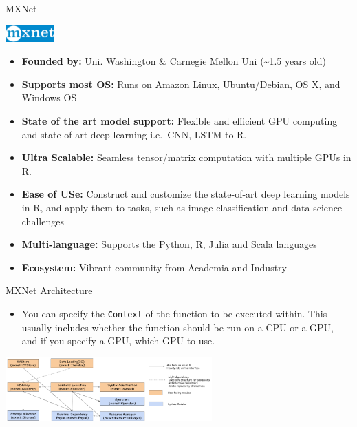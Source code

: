 \documentclass[ignorenonframetext,]{beamer}
\providecommand{\tightlist}{%
\setlength{\itemsep}{0pt}\setlength{\parskip}{0pt}}
\begin{document}
\begin{frame}{MXNet}

\begin{center}

\includegraphics[width=70px]{images/mxnet} 
\end{center}

\begin{itemize}
\tightlist
\item
  \textbf{Founded by:} Uni. Washington \& Carnegie Mellon Uni
  (\textasciitilde{}1.5 years old)
\item
  \textbf{Supports most OS:} Runs on Amazon Linux, Ubuntu/Debian, OS X,
  and Windows OS
\item
  \textbf{State of the art model support:} Flexible and efficient GPU
  computing and state-of-art deep learning i.e.~CNN, LSTM to R.
\item
  \textbf{Ultra Scalable:} Seamless tensor/matrix computation with
  multiple GPUs in R.
\item
  \textbf{Ease of USe:} Construct and customize the state-of-art deep
  learning models in R, and apply them to tasks, such as image
  classification and data science challenges
\item
  \textbf{Multi-language:} Supports the Python, R, Julia and Scala
  languages
\item
  \textbf{Ecosystem:} Vibrant community from Academia and Industry
\end{itemize}

\end{frame}

\begin{frame}[fragile]{MXNet Architecture}

\begin{itemize}
\tightlist
\item
  You can specify the \texttt{Context} of the function to be executed
  within. This usually includes whether the function should be run on a
  CPU or a GPU, and if you specify a GPU, which GPU to use.
\end{itemize}

\includegraphics[width=300px]{images/mxnet_overview}

\end{frame}
\end{document}
